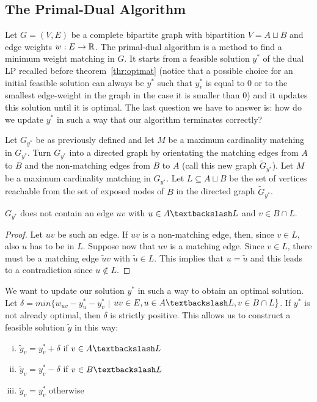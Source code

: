 \subsection*{The Primal-Dual Algorithm}
Let $G=(V,E)$ be a complete bipartite graph with bipartition 
$V=A \sqcup B$ and edge weights $w: E \rightarrow \mathbb{R}$. 
The primal-dual algorithm is a method to find a minimum weight 
matching in $G$.
It starts from a feasible solution $y^*$ of the dual LP recalled 
before theorem~\ref{thr:optmat} (notice that a possible 
choice for an initial feasible solution can always be $y^*$ such 
that $y^*_v$ is equal to $0$ or to the smallest edge-weight in 
the graph in the case it is smaller than $0$) 
and it updates this solution until it is optimal. 
The last question we have to answer is: how do we update $y^*$
in such a way that our algorithm terminates correctly?

Let $G_{y^*}$ be as previously defined and let $M$ be a maximum 
cardinality matching in $G_{y^*}$. Turn $G_{y^*}$ into a directed
graph by orientating the matching edges from $A$ to $B$ and the
non-matching edges from $B$ to $A$ (call this new graph 
$\tilde{G}_{y^*}$). 
Let $M$ be a maximum cardinality matching in $G_{y^*}$.
Let $L \subseteq A \sqcup B$ be the set of vertices reachable 
from the set of exposed nodes of $B$ in the directed graph 
$\tilde{G}_{y^*}$.

\begin{claim}
   $G_{y^*}$ does not contain an edge $uv$ with 
   $u \in A \textbackslash L$ and $v \in B \cap L$.
\end{claim}

\begin{proof}
   Let $uv$ be such an edge. If $uv$ is a non-matching edge, then, 
   since $v \in L$, also $u$ has to be in $L$. Suppose now that 
   $uv$ is a matching edge. Since $v \in L$, there must be a 
   matching edge $\tilde{u}v$ with $\tilde{u} \in L$. This implies 
   that $u = \tilde{u}$ and this leads to a contradiction since 
   $u \not\in L$.
\end{proof}

We want to update our solution $y^*$ in such a way to obtain 
an optimal solution. Let 
$\delta = min\{w_{uv}-y^*_u-y^*_v$ $|$
$uv \in E, u \in A \textbackslash L, v \in B \cap L\}$.
If $y^*$ is not already optimal, then $\delta$ is strictly positive.
This allows us to construct a feasible solution $\tilde{y}$ 
in this way:
\begin{enumerate}[i)]
   \item $\tilde{y}_v = y^*_v + \delta$ if 
         $v \in A \textbackslash L$
   \item $\tilde{y}_v = y^*_v - \delta$ if 
         $v \in B \textbackslash L$
   \item $\tilde{y}_v = y^*_v$ otherwise
\end{enumerate}

